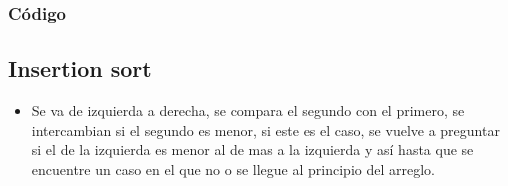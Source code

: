 \documentclass[letterpaper,10pt,spanish]{sphinxmanual}
\begin{document}
\subsubsection{Código}
\label{\detokenize{ordenamiento/fuerza_bruta:codigo}}
\begin{sphinxVerbatim}[commandchars=\\\{\},numbers=left,firstnumber=1,stepnumber=1]
      
       \PYG{p}{[}\PYG{p}{]}
    \PYG{p}{[}\PYG{p}{]}  \PYG{p}{[}\PYG{p}{]}
    \PYG{p}{[}\PYG{p}{]}  

    
       
               
                 
             \PYG{p}{[}\PYG{p}{]}  \PYG{p}{[}\PYG{p}{]} 
                    
\end{sphinxVerbatim}


\subsection{Insertion sort}
\label{\detokenize{ordenamiento/fuerza_bruta:insertion-sort}}\begin{itemize}
\item {} 
Se va de izquierda a derecha, se compara el segundo con el primero, se intercambian si el segundo es menor, si este es el caso, se vuelve a preguntar si el de la izquierda es menor al de mas a la izquierda y así hasta que se encuentre un caso en el que no o se llegue al principio del arreglo.

\end{itemize}
\end{document}
